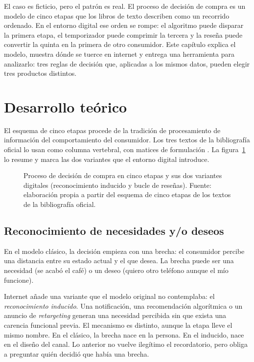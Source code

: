 El caso es ficticio, pero el patrón es real. El proceso de decisión de compra
es un modelo de cinco etapas que los libros de texto describen como un
recorrido ordenado. En el entorno digital ese orden se rompe: el algoritmo
puede disparar la primera etapa, el temporizador puede comprimir la tercera y
la reseña puede convertir la quinta en la primera de otro consumidor. Este
capítulo explica el modelo, muestra dónde se tuerce en internet y entrega una
herramienta para analizarlo: tres reglas de decisión que, aplicadas a los
mismos datos, pueden elegir tres productos distintos.

\section{Desarrollo teórico}

El esquema de cinco etapas procede de la tradición de procesamiento de
información del comportamiento del consumidor. Los tres textos de la
bibliografía oficial lo usan como columna vertebral, con matices de
formulación \parencite{solomon2023consumer,hoyer2024consumer,kotler2021marketing50}.
La figura~\ref{fig:cap06-proceso} lo resume y marca las dos variantes que el
entorno digital introduce.

\begin{figure}[!htb]
  \centering
  \resizebox{\textwidth}{!}{}
  \caption{Proceso de decisión de compra en cinco etapas y sus dos variantes
  digitales (reconocimiento inducido y bucle de reseñas). Fuente: elaboración
  propia a partir del esquema de cinco etapas de los textos de la bibliografía
  oficial.}
  \label{fig:cap06-proceso}
\end{figure}

\subsection{Reconocimiento de necesidades y/o deseos}

En el modelo clásico, la decisión empieza con una brecha: el consumidor
percibe una distancia entre su estado actual y el que desea. La brecha puede
ser una necesidad (se acabó el café) o un deseo (quiero otro teléfono aunque
el mío funcione).

Internet añade una variante que el modelo original no contemplaba: el
\emph{reconocimiento inducido}. Una notificación, una recomendación
algorítmica o un anuncio de \textit{retargeting} generan una necesidad
percibida sin que exista una carencia funcional previa. El mecanismo es
distinto, aunque la etapa lleve el mismo nombre. En el clásico, la brecha
nace en la persona. En el inducido, nace en el diseño del canal. Lo anterior
no vuelve ilegítimo el recordatorio, pero obliga a preguntar quién decidió
que había una brecha.

